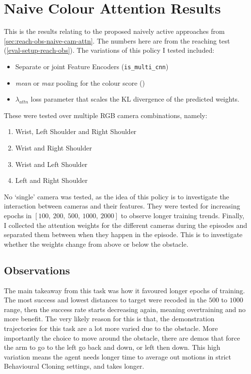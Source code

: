 \section{Naive Colour Attention Results}
This is the results relating to the proposed naively active approaches from \ref{sec:reach-obs-naive-cam-attn}. The numbers here are from the reaching test (\ref{eval-setup-reach-obs}).
The variations of this policy I tested included:
\begin{itemize}
  \itemsep0em
  \item Separate or joint Feature Encoders (\verb|is_multi_cnn|)
  \item \emph{mean} or \emph{max} pooling for the colour score (\verb||)
  \item $\lambda_{attn}$ loss parameter that scales the KL divergence of the predicted 
  weights.
\end{itemize}
These were tested over multiple RGB camera combinations, namely:
\begin{enumerate}
  \itemsep0em
  \item Wrist, Left Shoulder and Right Shoulder
  \item Wrist and Right Shoulder
  \item Wrist and Left Shoulder
  \item Left and Right Shoulder
\end{enumerate}
No `single' camera was tested, as the idea of this policy is to investigate the interaction between cameras and their features. They were tested for increasing epochs in \(\left[100, ~200, ~500, ~1000, ~2000\right]\) to observe longer training trends. Finally, I collected the attention weights for the different cameras during the episodes and separated them between when they happen in the episode. This is to investigate whether the weights change from above or below the obstacle.


\subsection{Observations}
The main takeaway from this task was how it favoured longer epochs of training. The most success and lowest distances to target were recoded in the $500$ to $1000$ range, then the success rate starts decreasing again, meaning overtraining and no more benefit.\todo[color=purple]{} The very likely reason for this is that, the demonstration trajectories for this task are a lot more varied due to the obstacle. More importantly the choice to move around the obstacle, there are demos that force the arm to go to the left go back and down, or left then down. This high variation means the agent needs longer time to average out motions in strict Behavioural Cloning settings, and takes longer.


